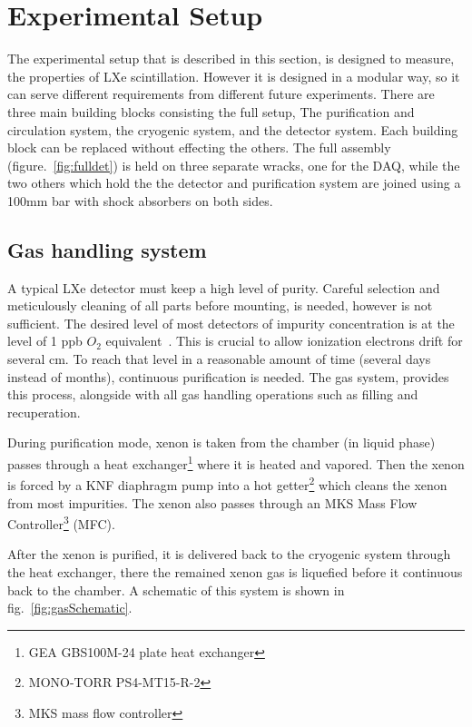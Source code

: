 \section{Experimental Setup}
\label{expSetup}
The experimental setup that is described in this section, is designed to measure, the properties of LXe scintillation. However it is designed in a modular way, so it can serve different requirements from different future experiments. There are three main building blocks consisting the full setup, The purification and circulation system, the cryogenic system, and the detector system. Each building block can be replaced without effecting the others. The full assembly (figure.~\ref{fig:fulldet}) is held on three separate wracks, one for the DAQ, while the two others which hold the the detector and purification system are joined using a 100mm bar with shock absorbers on both sides.   

\subsection{Gas handling system}
\label{subsec:gas}

A typical LXe detector must keep a high level of purity. Careful selection and meticulously cleaning of all parts before mounting, is needed, however is not sufficient. The desired level of most detectors of impurity concentration is at the level of 1 ppb $O_2$ equivalent~\cite{Aprile:2009dv}. This is crucial to allow ionization electrons drift for several cm. To reach that level in a reasonable amount of time (several days instead of months), continuous purification is needed. The gas system, provides this process, alongside with all gas handling operations such as filling and recuperation.

During purification mode, xenon is taken from the chamber (in liquid phase)
passes through a heat exchanger\footnote{GEA GBS100M-24 plate heat exchanger} where it is heated and vapored. Then the xenon is forced by a KNF diaphragm pump into a hot getter\footnote{MONO-TORR
PS4-MT15-R-2} which cleans the xenon from most impurities. The xenon
also passes through an MKS Mass Flow Controller\footnote{MKS mass flow controller} (MFC). 

After the xenon is purified, it is delivered back to the cryogenic system through the heat exchanger, there the remained xenon gas is liquefied before it continuous back to the chamber. A schematic of this system is shown in fig.~\ref{fig:gasSchematic}.


